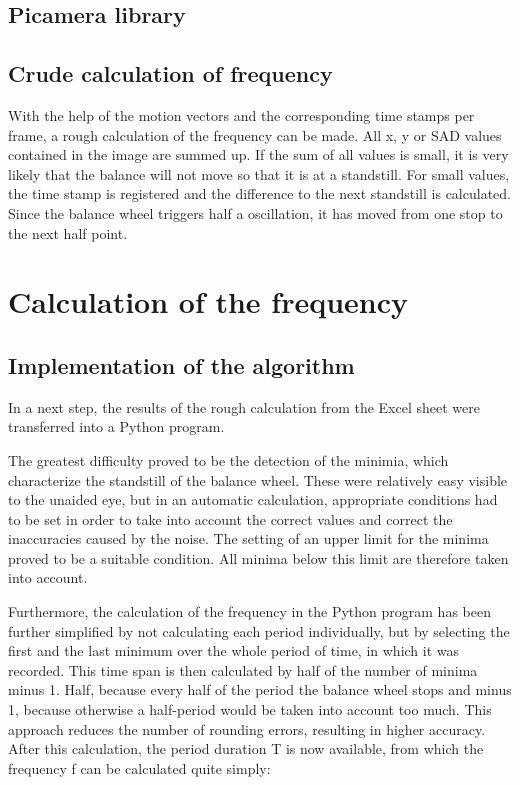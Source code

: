 \documentclass[12pt, a4paper]{report}
\begin{document}
\bigskip

\section{Picamera library}

\section{Crude calculation of frequency}
With the help of the motion vectors and the corresponding time stamps per frame, a rough calculation of the frequency can be made.
All x, y or SAD values contained in the image are summed up. If the sum of all values is small, it is very likely that the balance will not move so that it is at a standstill.
For small values, the time stamp is registered and the difference to the next standstill is calculated.
Since the balance wheel triggers half a oscillation, it has moved from one stop to the next half point. 
 
\chapter{Calculation of the frequency}

\section{Implementation of the algorithm}

In a next step, the results of the rough calculation from the Excel sheet were transferred into a Python program. 

The greatest difficulty proved to be the detection of the minimia, which characterize the standstill of the balance wheel. These were relatively easy visible to the unaided eye, but in an automatic calculation, appropriate conditions had to be set in order to take into account the correct values and correct the inaccuracies caused by the noise. The setting of an upper limit for the minima proved to be a suitable condition. All minima below this limit are therefore taken into account. 

Furthermore, the calculation of the frequency in the Python program has been further simplified by not calculating each period individually, but by selecting the first and the last minimum over the whole period of time, in which it was recorded. This time span is then calculated by half of the number of minima minus 1. Half, because every half of the period the balance wheel stops and minus 1, because otherwise a half-period would be taken into account too much. This approach reduces the number of rounding errors, resulting in higher accuracy. After this calculation, the period duration T is now available, from which the frequency f can be calculated quite simply: 
\end{document}
